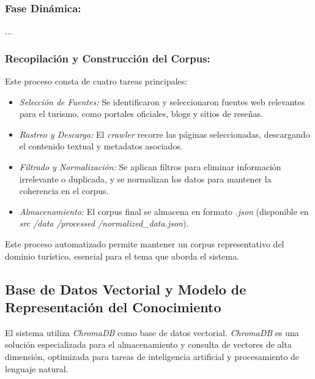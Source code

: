 \documentclass[10pt]{llncs}
\begin{document}
\subsubsection{Fase Dinámica:} ...

\subsubsection{Recopilación y Construcción del Corpus:} Este proceso consta de cuatro tareas principales:

\begin{itemize}
    \item \textit{Selección de Fuentes:} Se identificaron y seleccionaron fuentes web relevantes para el turismo, como portales oficiales, blogs y sitios de reseñas.
    \item \textit{Rastreo y Descarga:} El \textit{crawler} recorre las páginas seleccionadas, descargando el contenido textual y metadatos asociados.
    \item \textit{Filtrado y Normalización:} Se aplican filtros para eliminar información irrelevante o duplicada, y se normalizan los datos para mantener la coherencia en el corpus.
    \item \textit{Almacenamiento:} El corpus final se almacena en formato \textit{.json} (disponible en \textit{src /data /processed /normalized\_data.json}).
\end{itemize}

Este proceso automatizado permite mantener un corpus representativo del dominio turístico, esencial para el tema que aborda el sistema.

\vspace{\baselineskip}
\subsection{Base de Datos Vectorial y Modelo de Representación del Conocimiento}

El sistema utiliza \textit{ChromaDB} como base de datos vectorial. \textit{ChromaDB} es una solución 
especializada para el almacenamiento y consulta de vectores de alta dimensión, optimizada para tareas de inteligencia artificial y procesamiento de lenguaje natural.
\end{document}
